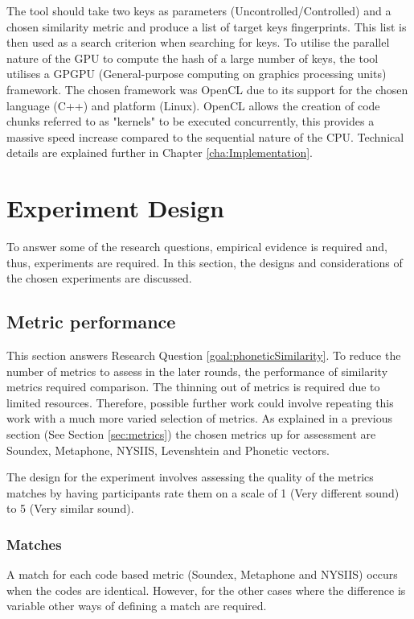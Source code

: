 The tool should take two keys as parameters (Uncontrolled/Controlled) and a chosen similarity metric and produce a list of target keys fingerprints. This list is then used as a search criterion when searching for keys. To utilise the parallel nature of the GPU to compute the hash of a large number of keys, the tool utilises a GPGPU (General-purpose computing on graphics processing units) framework. The chosen framework was OpenCL due to its support for the chosen language (C++) and platform (Linux). OpenCL allows the creation of code chunks referred to as "kernels" to be executed concurrently, this provides a massive speed increase compared to the sequential nature of the CPU. Technical details are explained further in Chapter \ref{cha:Implementation}.

\section{Experiment Design}
To answer some of the research questions, empirical evidence is required and, thus, experiments are required. In this section, the designs and considerations of the chosen experiments are discussed.

\subsection{Metric performance}
\label{exp:metric}
This section answers Research Question \ref{goal:phoneticSimilarity}. To reduce the number of metrics to assess in the later rounds, the performance of similarity metrics required comparison. The thinning out of metrics is required due to limited resources. Therefore, possible further work could involve repeating this work with a much more varied selection of metrics. As explained in a previous section (See Section \ref{sec:metrics}) the chosen metrics up for assessment are Soundex, Metaphone, NYSIIS, Levenshtein and Phonetic vectors.

The design for the experiment involves assessing the quality of the metrics matches by having participants rate them on a scale of 1 (Very different sound) to 5 (Very similar sound).

\subsubsection{Matches}
\label{sec:matches}

A match for each code based metric (Soundex, Metaphone and NYSIIS) occurs when the codes are identical. However, for the other cases where the difference is variable other ways of defining a match are required.

